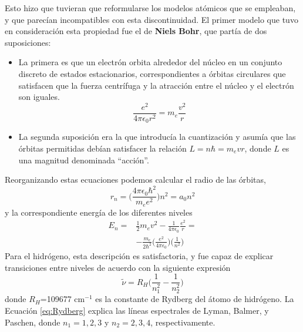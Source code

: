 Esto hizo que tuvieran que reformularse los modelos atómicos que 
se empleaban, y que parecían incompatibles con esta discontinuidad.
El primer modelo que tuvo en consideración esta propiedad fue
el de \textbf{Niels Bohr}, que partía de dos suposiciones: 
\begin{itemize}[i]
    \item La primera es que un electrón orbita alrededor del
    núcleo en un conjunto discreto de estados estacionarios, 
    correspondientes a órbitas circulares que satisfacen que la
    fuerza centrífuga y la atracción entre el núcleo y el electrón
    son iguales.
    \begin{equation}
        \frac{e^2}{4\pi \epsilon_0 r^2}=m_e\frac{v^2}{r}
    \end{equation}
    \item La segunda suposición era la que introducía la cuantización
    y asumía que las órbitas permitidas debían satisfacer la relación
    $L=n\hbar=m_evr$, donde $L$ es una magnitud denominada ``acción''.
\end{itemize}
Reorganizando estas ecuaciones podemos calcular el radio de las órbitas,
\begin{equation}
    r_n=\bigg(\frac{4\pi \epsilon_0\hbar^2}{m_ee^2}\bigg)n^2=a_0n^2    
\end{equation}
y la correspondiente energía de los diferentes niveles
\begin{equation}
    \begin{split}
    E_n= & \frac{1}{2}m_ev^2 - \frac{1}{4\pi \epsilon_0}\frac{e^2}{r}=\\
    & -\frac{m_e}{2\hbar^2}\bigg(\frac{e^2}{4\pi\epsilon_0}\bigg)\bigg(\frac{1}{n^2}\bigg)
    \end{split}
\end{equation}
Para el hidrógeno, esta descripción es satisfactoria, y fue capaz de
explicar transiciones entre niveles de acuerdo con la siguiente 
expresión
\begin{equation}
    \tilde{\nu}=R_H\bigg(\frac{1}{n^2_1} -\frac{1}{n^2_2}\bigg) 
    \label{eq:Rydberg}
\end{equation}
donde $R_H$=109677 cm$^{-1}$ es la constante de Rydberg del 
átomo de hidrógeno. La Ecuación \ref{eq:Rydberg} explica las líneas
espectrales de Lyman, Balmer, y Paschen, donde $n_1=1,2, 3$ y
$n_2=2,3,4$, respectivamente.
